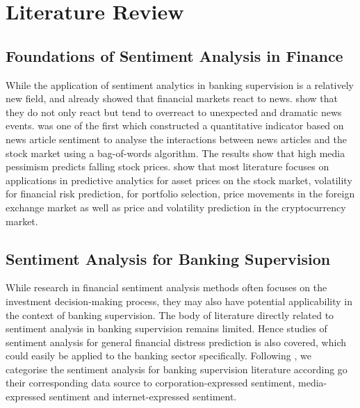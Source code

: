 \chapter{Literature Review}\label{sec3}
\thispagestyle{empty}



\section{Foundations of Sentiment Analysis in Finance}

While the application of sentiment analytics in banking supervision is a relatively new field, \cite{debondt1985} and \cite{cutler1988} already showed that financial markets react to news. \cite{debondt1985} show that they do not only react but tend to overreact to unexpected and dramatic news events. \cite{tetlock2007} was one of the first which constructed a quantitative indicator based on news article sentiment to analyse the interactions between news articles and the stock market using a bag-of-words algorithm. The results show that high media pessimism predicts falling stock prices. \cite{du2024} show that most literature focuses on applications in predictive analytics for asset prices on the stock market, volatility for financial risk prediction, for portfolio selection, price movements in the foreign exchange market as well as price and volatility prediction in the cryptocurrency market.

\section{Sentiment Analysis for Banking Supervision}

While research in financial sentiment analysis methods often focuses on the investment decision-making process, they may also have potential applicability in the context of banking supervision. The body of literature directly related to sentiment analysis in banking supervision remains limited. Hence studies of sentiment analysis for general financial distress prediction is also covered, which could easily be applied to the banking sector specifically. Following \cite{kearney2014}, we categorise the sentiment analysis for banking supervision literature according go their corresponding data source to corporation-expressed sentiment, media-expressed sentiment and internet-expressed sentiment. \\

